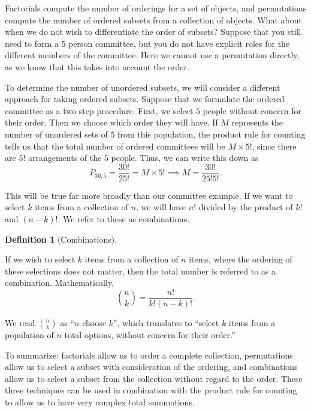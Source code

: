 \documentclass[
  letterpaper,
  DIV=11,
  numbers=noendperiod]{scrreprt}
\theoremstyle{definition}
\theoremstyle{definition}
\theoremstyle{definition}
\newtheorem{definition}{Definition}[chapter]
\theoremstyle{remark}
\begin{document}
Factorials compute the number of orderings for a set of objects, and
permutations compute the number of ordered subsets from a collection of
objects. What about when we do not wish to differentiate the order of
subsets? Suppose that you still need to form a \(5\) person committee,
but you do not have explicit roles for the different members of the
committee. Here we cannot use a permutation directly, as we know that
this takes into account the order.

To determine the number of unordered subsets, we will consider a
different approach for taking ordered subsets. Suppose that we formulate
the ordered committee as a two step procedure. First, we select \(5\)
people without concern for their order. Then we choose which order they
will have. If \(M\) represents the number of unordered sets of \(5\)
from this population, the product rule for counting tells us that the
total number of ordered committees will be \(M\times 5!\), since there
are \(5!\) arrangements of the \(5\) people. Thus, we can write this
down as
\[P_{30,5} = \frac{30!}{25!} = M\times 5! \implies M = \frac{30!}{25!5!}.\]

This will be true far more broadly than our committee example. If we
want to select \(k\) items from a collection of \(n\), we will have
\(n!\) divided by the product of \(k!\) and \((n-k)!\). We refer to
these as combinations.

\begin{definition}[Combinations]\protect\hypertarget{def-combinations}{}\label{def-combinations}

If we wish to select \(k\) items from a collection of \(n\) items, where
the ordering of these selections does not matter, then the total number
is referred to as a combination. Mathematically,
\[\binom{n}{k} = \frac{n!}{k!(n-k)!}.\]

\end{definition}

We read \(\binom{n}{k}\) as ``\(n\) choose \(k\)'', which translates to
``select \(k\) items from a population of \(n\) total options, without
concern for their order.''

To summarize: factorials allow us to order a complete collection,
permutations allow us to select a subset with consideration of the
ordering, and combinations allow us to select a subset from the
collection without regard to the order. These three techniques can be
used in combination with the product rule for counting to allow us to
have very complex total summations.
\end{document}

